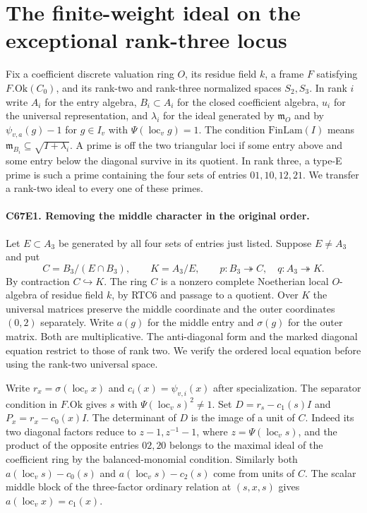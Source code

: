 \section{The finite-weight ideal on the exceptional rank-three locus}

Fix a coefficient discrete valuation ring $O$, its residue field $k$,
a frame $F$ satisfying $F.\mathrm{Ok}(C_0)$, and its rank-two and
rank-three normalized spaces $S_2,S_3$. In rank $i$ write $A_i$ for
the entry algebra, $B_i\subset A_i$ for the closed coefficient
algebra, $u_i$ for the universal representation, and $\lambda_i$
for the ideal generated by $\mathfrak m_O$ and by
$\psi_{v,a}(g)-1$ for $g\in I_v$ with $\Psi(\operatorname{loc}_v g)=1$.
The condition $\mathrm{FinLam}(I)$ means
$\mathfrak m_{B_i}\subseteq\sqrt{I+\lambda_i}$.
A prime is off the two triangular loci if some entry above and
some entry below the diagonal survive in its quotient. In rank
three, a type-E prime is such a prime containing the four sets
of entries $01,10,12,21$. We transfer a rank-two ideal to every
one of these primes.

\paragraph{C67E1. Removing the middle character in the original order.}
Let $E\subset A_3$ be generated by all four sets of entries just
listed. Suppose $E\ne A_3$ and put
\[
      C=B_3/(E\cap B_3),\qquad K=A_3/E,\qquad
      p:B_3\twoheadrightarrow C,\quad q:A_3\twoheadrightarrow K .
\]
By contraction $C\hookrightarrow K$. The ring $C$ is a nonzero
complete Noetherian local $O$-algebra of residue field $k$, by RTC6
and passage to a quotient. Over $K$ the universal matrices preserve the
middle coordinate and the outer coordinates $(0,2)$ separately.
Write $a(g)$ for the middle entry and $\sigma(g)$ for the outer
matrix. Both are multiplicative. The anti-diagonal form and the
marked diagonal equation restrict to those of rank two. We verify
the ordered local equation before using the rank-two universal space.

Write $r_x=\sigma(\operatorname{loc}_v x)$ and $c_i(x)=\psi_{v,i}(x)$
after specialization. The separator condition in $F.\mathrm{Ok}$
gives $s$ with $\Psi(\operatorname{loc}_v s)^2\ne1$.
Set $D=r_s-c_1(s)I$ and $P_x=r_x-c_0(x)I$.
The determinant of $D$ is the image of a unit of $C$. Indeed its
two diagonal factors reduce to $z-1,z^{-1}-1$, where
$z=\Psi(\operatorname{loc}_v s)$, and the product of the opposite
entries $02,20$ belongs to the maximal ideal of the coefficient ring
by the balanced-monomial condition. Similarly both
$a(\operatorname{loc}_v s)-c_0(s)$ and
$a(\operatorname{loc}_v s)-c_2(s)$ come from units of $C$.
The scalar middle block of the three-factor ordinary relation at
$(s,x,s)$ gives $a(\operatorname{loc}_v x)=c_1(x)$.

